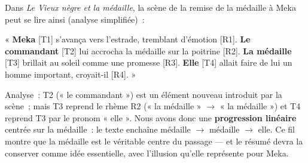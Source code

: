 \documentclass[11pt]{article}
\begin{document}
\begin{exemplebox}
Dans \emph{Le Vieux nègre et la médaille}, la scène de la remise de la médaille à Meka peut se lire ainsi (analyse simplifiée)~:

« \textbf{Meka} [T1] s'avança vers l'estrade, tremblant d'émotion [R1]. \textbf{Le commandant} [T2] lui accrocha la médaille sur la poitrine [R2]. \textbf{La médaille} [T3] brillait au soleil comme une promesse [R3]. \textbf{Elle} [T4] allait faire de lui un homme important, croyait-il [R4]. »

Analyse~: T2 (« le commandant ») est un élément nouveau introduit par la scène~; mais T3 reprend le rhème R2 (« la médaille » $\rightarrow$ « la médaille ») et T4 reprend T3 par le pronom « elle ». Nous avons donc une \textbf{progression linéaire} centrée sur la médaille~: le texte enchaîne médaille $\rightarrow$ médaille $\rightarrow$ elle. Ce fil montre que la médaille est le véritable centre du passage — et le résumé devra la conserver comme idée essentielle, avec l'illusion qu'elle représente pour Meka.
\end{exemplebox}
\end{document}
